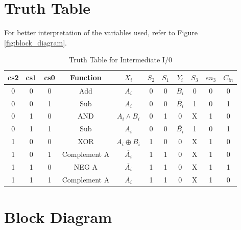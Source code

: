 \documentclass[12pt]{article}
\begin{document}
\section{\large{Truth Table}}
For better interpretation of the variables used, refer to Figure \ref{fig:block_diagram}.
\begin{table}[H]
    \centering
    \begin{tabular}{|ccc|c|c|c|c|c|c|c|c|}
    \hline
         cs2 & cs1 & cs0 & Function & $X_i$ & $S_2$ & $S_1$ & $Y_i$ & $S_3$ & $en_3$ & $C_{in}$  \\
         \hline
         0 & 0 & 0 & Add & $A_i$ & 0 & 0 & $B_i$ & 0 & 0 & 0  \\
         0 & 0 & 1 & Sub  & $A_i$ & 0 & 0 & $\overline{B_i}$ & 1 & 0 & 1 \\
         0 & 1 & 0 & AND & $A_i \land B_i$ & 0 & 1 & 0 & X & 1 & 0 \\
         0 & 1 & 1 & Sub  & $A_i$ & 0 & 0 & $\overline{B_i}$ & 1 & 0 & 1 \\
         1 & 0 & 0 & XOR & $A_i \oplus B_i$ & 1 & 0 & 0 & X & 1 & 0 \\
         1 & 0 & 1 & Complement A & $\overline{A_i}$ & 1 & 1 & 0 & X & 1 & 0 \\
         1 & 1 & 0 & NEG A & $\overline{A_i}$ & 1 & 1 & 0 & X & 1 & 1 \\
         1 & 1 & 1 & Complement A & $\overline{A_i}$ & 1 & 1 & 0 & X & 1 & 0 \\
         \hline
    \end{tabular}
    \caption{Truth Table for Intermediate I/0}
    \label{tab:truth_table}
\end{table}


\newpage
\section{\large{Block Diagram}}
\vspace{15mm}
\end{document}
